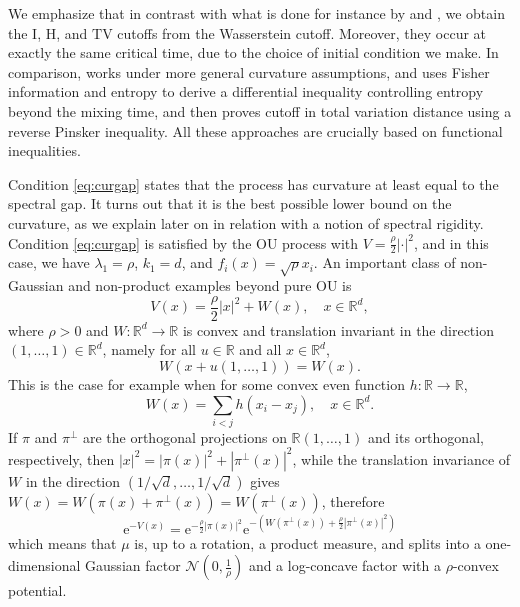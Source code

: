 \documentclass[10pt,reqno]{amsart}
\numberwithin{equation}{section}
\begin{document}
We emphasize that in contrast with what is done for instance by \cite{BCL23}
and \cite{salez-2025}, we obtain the $\mathrm{I}$, $\mathrm{H}$, and
$\mathrm{TV}$ cutoffs from the Wasserstein cutoff. Moreover, they occur at
exactly the same critical time, due to the choice of initial condition we
make. In comparison, \cite{salez-2025} works under more general curvature
assumptions, and uses Fisher information and entropy to derive a differential
inequality controlling entropy beyond the mixing time, and then proves cutoff
in total variation distance using a reverse Pinsker inequality. All these
approaches are crucially based on functional inequalities.

Condition \eqref{eq:curgap} states that the process has curvature at least
equal to the spectral gap. It turns out that it is the best possible lower
bound on the curvature, as we explain later on in relation with a notion of
spectral rigidity. Condition \eqref{eq:curgap} is satisfied by the OU process
with $V=\frac{\rho}{2}\left|\cdot\right|^2$, and in this case, we have
$\lambda_1=\rho$, $k_1=d$, and $f_i(x)=\sqrt{\rho}x_i$. An important class of
non-Gaussian and non-product examples beyond pure OU is
\begin{equation}\label{eq:VW}
    V(x)=\frac{\rho}{2}|x|^2+W(x), \quad x\in\mathbb{R}^d,
\end{equation}
where $\rho>0$ and $W:\mathbb{R}^d\to\mathbb{R}$ is convex and
translation invariant in the direction $(1,\ldots,1)\in\mathbb{R}^d$, namely
for all $u\in\mathbb{R}$ and all $x\in\mathbb{R}^d$,
\begin{equation}
    W(x+u(1,\ldots,1))=W(x).
\end{equation}
This is the case for example when
for some convex even function $h:\mathbb{R}\to\mathbb{R}$,
\begin{equation}
W(x)=\sum_{i<j}h(x_i-x_j),\quad x\in\mathbb{R}^d.
\end{equation}
If $\pi$ and $\pi^\perp$ are the orthogonal projections on
$\mathbb{R}(1,\ldots,1)$ and its orthogonal, respectively, then
$|x|^2=|\pi(x)|^2+|\pi^\perp(x)|^2$, while the translation invariance of $W$
in the direction $(1/\sqrt{d},\ldots,1/\sqrt{d})$ gives
$W(x)=W(\pi(x)+\pi^\perp(x))=W(\pi^\perp(x))$, therefore
\begin{equation}
\mathrm{e}^{-V(x)}
=\mathrm{e}^{-\frac{\rho}{2}|\pi(x)|^2}\mathrm{e}^{-(W(\pi^\perp(x))+\frac{\rho}{2}|\pi^\perp(x)|^2)}
\end{equation}
which means that $\mu$ is, up to a rotation, a product measure, and splits
into a one-dimensional Gaussian factor $\mathcal{N}(0,\frac{1}{\rho})$ and a
log-concave factor with a $\rho$-convex potential.
\end{document}
